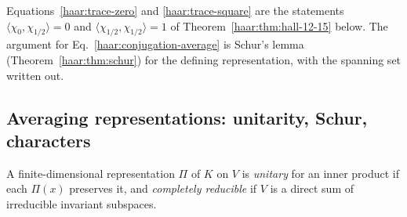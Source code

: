 Equations~\eqref{haar:trace-zero} and \eqref{haar:trace-square} are the
statements $\langle\chi_0,\chi_{1/2}\rangle=0$ and
$\langle\chi_{1/2},\chi_{1/2}\rangle=1$ of Theorem~\ref{haar:thm:hall-12-15}
below. The argument for Eq.~\eqref{haar:conjugation-average} is Schur's
lemma (Theorem~\ref{haar:thm:schur}) for the defining representation, with
the spanning set written out.

\subsection{Averaging representations: unitarity, Schur, characters}
A finite-dimensional representation $\Pi$ of $K$ on $V$ is \emph{unitary}
for an inner product if each $\Pi(x)$ preserves it, and \emph{completely
reducible} if $V$ is a direct sum of irreducible invariant subspaces.


